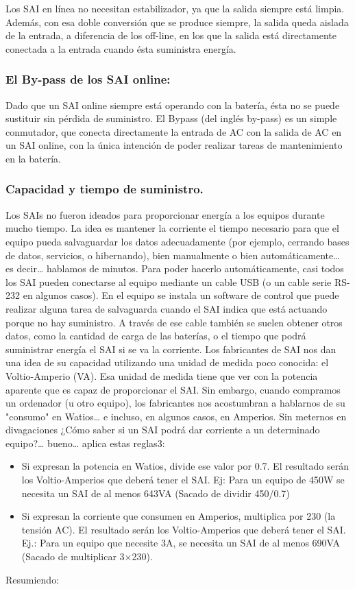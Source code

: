 \documentclass{article}
\begin{document}
Los SAI en línea no necesitan estabilizador, ya que la salida siempre está limpia. Además, con esa doble conversión que se produce siempre, la salida queda aislada de la entrada, a diferencia de los off-line, en los que la salida está directamente conectada a la entrada cuando ésta suministra energía.

\subsubsection{El By-pass de los SAI online:}
\label{sec:org674b8d9}
Dado que un SAI online siempre está operando con la batería, ésta no se puede sustituir sin pérdida de suministro.
El Bypass (del inglés by-pass) es un simple conmutador, que conecta directamente la entrada de AC con la salida de AC en un SAI online, con la única intención de poder realizar tareas de mantenimiento en la batería.

\subsubsection{Capacidad y tiempo de suministro.}
\label{sec:org7cbb6a1}
Los SAIs no fueron ideados para proporcionar energía a los equipos durante mucho tiempo. La idea es mantener la corriente el tiempo necesario para que el equipo pueda salvaguardar los datos adecuadamente (por ejemplo, cerrando bases de datos, servicios, o hibernando), bien manualmente o bien automáticamente\ldots{} es decir\ldots{} hablamos de minutos.
Para poder hacerlo automáticamente, casi todos los SAI pueden conectarse al equipo mediante un cable USB (o un cable serie RS-232 en algunos casos). En el equipo se instala un software de control que puede realizar alguna tarea de salvaguarda cuando el SAI indica que está actuando porque no hay suministro.
A través de ese cable también se suelen obtener otros datos, como la cantidad de carga de las baterías, o el tiempo que podrá suministrar energía el SAI si se va la corriente.
Los fabricantes de SAI nos dan una idea de su capacidad utilizando una unidad de medida poco conocida: el Voltio-Amperio (VA). Esa unidad de medida tiene que ver con la potencia aparente que es capaz de proporcionar el SAI.
Sin embargo, cuando compramos un ordenador (u otro equipo), los fabricantes nos acostumbran a hablarnos de su "consumo" en Watios\ldots{} e incluso, en algunos casos, en Amperios. Sin meternos en divagaciones ¿Cómo saber si un SAI podrá dar corriente a un determinado equipo?\ldots{} bueno\ldots{} aplica estas reglas3:
\begin{itemize}
\item Si expresan la potencia en Watios, divide ese valor por 0.7. El resultado serán los Voltio-Amperios que deberá tener el SAI. Ej: Para un equipo de 450W se necesita un SAI de al menos 643VA (Sacado de dividir 450/0.7)
\item Si expresan la corriente que consumen en Amperios, multiplica por 230 (la tensión AC). El resultado serán los Voltio-Amperios que deberá tener el SAI. Ej.: Para un equipo que necesite 3A, se necesita un SAI de al menos 690VA (Sacado de multiplicar 3×230).
\end{itemize}
Resumiendo:
\end{document}
